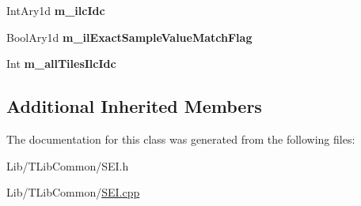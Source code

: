 \begin{DoxyCompactItemize}
\item 
\mbox{\label{class_s_e_i_inter_layer_constrained_tile_sets_a21d125fb845c75254abf8e2850397ba7}} 
Int\+Ary1d {\bfseries m\+\_\+ilc\+Idc}
\item 
\mbox{\label{class_s_e_i_inter_layer_constrained_tile_sets_ac92e59b036afe402c0240b2f21b2eda7}} 
Bool\+Ary1d {\bfseries m\+\_\+il\+Exact\+Sample\+Value\+Match\+Flag}
\item 
\mbox{\label{class_s_e_i_inter_layer_constrained_tile_sets_af459030e9c5d3511bda806a8c728df23}} 
Int {\bfseries m\+\_\+all\+Tiles\+Ilc\+Idc}
\end{DoxyCompactItemize}
\subsection*{Additional Inherited Members}


The documentation for this class was generated from the following files\+:\begin{DoxyCompactItemize}
\item 
Lib/\+T\+Lib\+Common/S\+E\+I.\+h\item 
Lib/\+T\+Lib\+Common/\hyperlink{_s_e_i_8cpp}{S\+E\+I.\+cpp}\end{DoxyCompactItemize}
